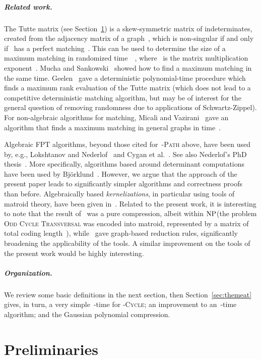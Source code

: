 \documentclass[a4paper,11pt]{article}
\newcommand{\cclass}[1]{\ensuremath{\mbox{\textup{#1}}}\xspace}
\newcommand{\NP}{\cclass{NP}}
\begin{document}
\subparagraph*{Related work.}
The Tutte matrix (see Section~\ref{sec:prel}) is a skew-symmetric matrix of
indeterminates, created from the adjacency matrix of a graph~, which is non-singular if
and only if~ has a perfect matching~\cite{Tutte47}. This can be used to determine the
size of a maximum matching in randomized time~~\cite{Lovasz79,MuchaS04},
where~ is the matrix multiplication exponent~\cite{Vassilevska12,Stothers,CoppersmithW90}. 
Mucha and Sankowski~\cite{MuchaS04} showed how to find a maximum matching in the same time.
Geelen~\cite{Geelen00} gave a deterministic polynomial-time procedure which finds a
maximum rank evaluation of the Tutte matrix (which does not lead to a competitive
deterministic matching algorithm, but may be of interest for the general question of
removing randomness due to applications of Schwartz-Zippel). 
For non-algebraic algorithms for matching, Micali and Vazirani~\cite{MicaliV80} gave an
algorithm that finds a maximum matching in general graphs in time~. 

Algebraic FPT algorithms, beyond those cited for~\textsc{-Path} above, have been used
by, e.g., Lokshtanov and Nederlof~\cite{LokshtanovN10} and Cygan et al.~\cite{CyganKPPW12}.
See also Nederlof's PhD thesis~\cite{Nederlof}. More specifically, algorithms based around
determinant computations have been used by Bj\"orklund~\cite{Bjorklund10a,Bjorklund10b}.
However, we argue that the approach of the present paper leads to significantly simpler
algorithms and correctness proofs than before. Algebraically based \emph{kernelizations},
in particular using tools of matroid theory, have been given
in~\cite{KratschW12a,KratschW12b}. Related to the present work, it is interesting to note
that the result of~\cite{KratschW12a} was a pure compression, albeit within \NP (the
problem \textsc{Odd Cycle Transversal} was encoded into matroid, represented by a matrix
of total coding length~), 
while~\cite{KratschW12b} gave graph-based reduction rules, significantly broadening the
applicability of the tools. A similar improvement on the tools of the present work would be highly
interesting. 


\subparagraph*{Organization.}
We review some basic definitions in the next section, then Section~\ref{sec:themeat}
gives, in turn, a very simple~-time for \textsc{-Cycle}; an improvement to
an~-time algorithm; and the Gaussian polynomial compression. 

\section{Preliminaries} \label{sec:prel}
\end{document}
